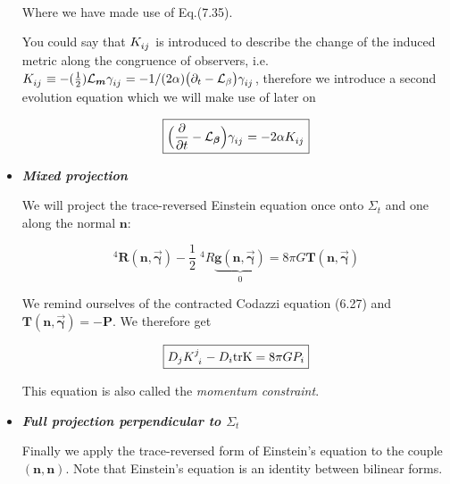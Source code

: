 \documentclass[12pt]{article}
\renewcommand{\vec}[1]{\bm{#1}}
\numberwithin{equation}{section}
\numberwithin{theorem}{subsection}
\begin{document}
\begin{itemize}
\begin{align}
    \end{align}

    Where we have made use of Eq.(7.35). 

\newline You could say that $\tensor{K}{_i_j}$ is introduced to describe the change of the induced metric along the congruence of observers, i.e. $\tensor{K}{_i_j} \equiv -(\frac{1}{2})\mathcal{L}_{\vec{m}}\tensor{\gamma}{_i_j} = -1/(2\alpha) \big(\partial_{t} -\mathcal{L}_{\beta} \big)\tensor{\gamma}{_i_j}$, therefore we introduce a second evolution equation which we will make use of later on

\begin{equation}

    \boxed{\Big(\frac{\partial}{\partial t} - \mathcal{L}_{\vec{\beta}} \Big)\tensor{\gamma}{_i_j} = -2\alpha\tensor{K}{_i_j}}

\end{equation}

    \item \textit{\textbf{Mixed projection}} \smallskip

\newline We will project the trace-reversed Einstein equation once onto $\Sigma_{t}$ and one along the normal $\vec{n}$:

    \begin{equation}

        ^{4}\vec{R}(\vec{n},\overrightarrow{\vec{\gamma}}) - \frac{1}{2}\; ^{4}R \underbrace{\vec{g}(\vec{n},\overrightarrow{\vec{\gamma}})}_{0} = 8\pi G \vec{T}(\vec{n},\overrightarrow{\vec{\gamma}})

    \end{equation}

    We remind ourselves of the contracted Codazzi equation (6.27) and $\vec{T}(\vec{n},\overrightarrow{\vec{\gamma}}) = -\vec{P}$. We therefore get 

    \begin{equation}

        \boxed{D_{j}\tensor{K}{^j_i}-D_{i}\textrm{trK} = 8 \pi G P_{i}}

    \end{equation}

  This equation is also called the \textit{momentum constraint}.  

    \item \textbf{\textit{Full projection perpendicular to $\Sigma_{t}$}} \smallskip

    \newline Finally we apply the trace-reversed form of Einstein's equation to the couple $(\vec{n},\vec{n})$. Note that Einstein's equation is an identity between bilinear forms.


\end{itemize}
\end{document}
